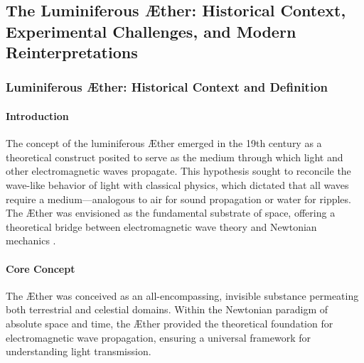 
    \subsection{The Luminiferous Æther: Historical Context, Experimental Challenges, and Modern Reinterpretations}

    \subsubsection*{Luminiferous Æther: Historical Context and Definition}
    \paragraph*{Introduction}
    The concept of the luminiferous Æther emerged in the 19th century as a theoretical construct posited to serve as the medium through which light and other electromagnetic waves propagate. This hypothesis sought to reconcile the wave-like behavior of light with classical physics, which dictated that all waves require a medium—analogous to air for sound propagation or water for ripples. The Æther was envisioned as the fundamental substrate of space, offering a theoretical bridge between electromagnetic wave theory and Newtonian mechanics \cite{young1801,maxwell1865,michelson1887,einstein1905,higgs1964}.

    \paragraph*{Core Concept}
    The Æther was conceived as an all-encompassing, invisible substance permeating both terrestrial and celestial domains. Within the Newtonian paradigm of absolute space and time, the Æther provided the theoretical foundation for electromagnetic wave propagation, ensuring a universal framework for understanding light transmission.

